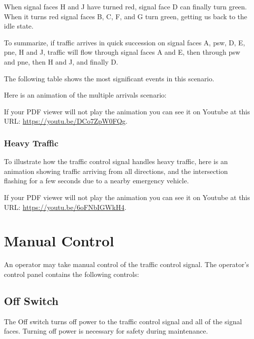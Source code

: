 \documentclass[letterpaper,twoside]{article}
\begin{document}
When signal faces H and J have turned red, signal face D
can finally turn green.  When it turns red signal faces
B, C, F, and G turn green, getting us back to the idle state.

To summarize, if traffic arrives in quick succession on signal faces
A, psw, D, E, pne, H and J, traffic will flow through signal faces
A and E, then through psw and pne, then H and J, and finally D.

The following table shows the most significant events in this scenario.



Here is an animation of the multiple arrivals scenario:

\noindent{}

If your PDF viewer will not play the animation you can see it on Youtube
at this URL:
\href{https://youtu.be/DCo7ZpW0FQg}{https://youtu.be/DCo7ZpW0FQg}.

\subsubsection{Heavy Traffic}

To illustrate how the traffic control signal handles heavy traffic,
here is an animation showing traffic arriving from all directions,
and the intersection flashing for a few seconds due to a nearby
emergency vehicle.

\noindent{}

If your PDF viewer will not play the animation you can see it on Youtube
at this URL:
\href{https://youtu.be/6oFNbIGWkH4}{https://youtu.be/6oFNbIGWkH4}.

\section{Manual Control}

An operator may take manual control of the traffic control signal.
The operator's control panel contains the following controls:

\subsection{Off Switch}
The Off switch turns off power to the traffic control signal and all
of the signal faces.  Turning off power is necessary for safety during
maintenance.
\end{document}
